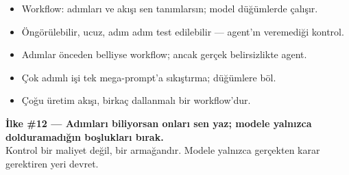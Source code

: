 \begin{itemize}
  \item Workflow: adımları ve akışı sen tanımlarsın; model düğümlerde çalışır.
  \item Öngörülebilir, ucuz, adım adım test edilebilir --- agent'ın veremediği kontrol.
  \item Adımlar önceden belliyse workflow; ancak gerçek belirsizlikte agent.
  \item Çok adımlı işi tek mega-prompt'a sıkıştırma; düğümlere böl.
  \item Çoğu üretim akışı, birkaç dallanmalı bir workflow'dur.
\end{itemize}

\begin{principlebox}
\textbf{İlke \#12 — Adımları biliyorsan onları sen yaz; modele yalnızca dolduramadığın boşlukları bırak.}\\[4pt]
\normalsize Kontrol bir maliyet değil, bir armağandır. Modele yalnızca gerçekten
karar gerektiren yeri devret.
\end{principlebox}
